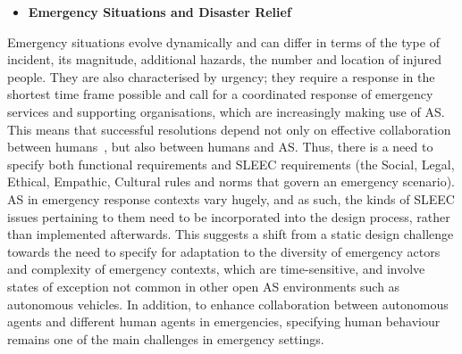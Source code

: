 \documentclass[sigconf,nonacm]{acmart}%
\begin{document}
\normalsize	


	
	\begin{itemize}[leftmargin=0.5cm]
		\item \textbf{Emergency Situations and Disaster Relief}
	\end{itemize}
	Emergency situations evolve dynamically and can differ in terms of the type of incident, its magnitude, additional hazards, the number and location of injured people. They are also characterised by urgency; they require a response in the shortest time frame possible and call for a coordinated response of emergency services and supporting organisations, which are increasingly making use of AS. This means that successful resolutions depend not only on effective collaboration between humans~\cite{james2011organizational}, but also between humans and AS. Thus, there is a need to specify both functional requirements and SLEEC requirements (the Social, Legal, Ethical, Empathic, Cultural rules and norms that govern an emergency scenario). AS in emergency response contexts vary hugely, and as such, the kinds of SLEEC issues pertaining to them need to be incorporated into the design process, rather than implemented afterwards. This suggests a shift from a static design challenge towards the need to specify for adaptation to the diversity of emergency actors and complexity of emergency contexts, which are time-sensitive, and involve states of exception not common in other open AS environments such as autonomous vehicles. In addition, to enhance collaboration between autonomous agents and different human agents in emergencies, specifying human behaviour remains one of the main challenges in emergency settings. 
\end{document}
